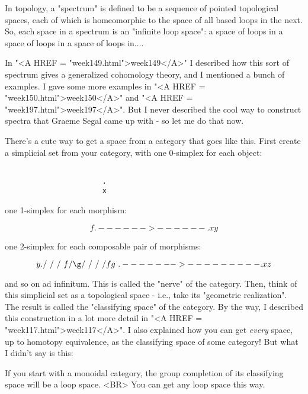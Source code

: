 In topology, a "spectrum" is defined to be a sequence of pointed
topological spaces, each of which is homeomorphic to the space of all
based loops in the next.  So, each space in a spectrum is an "infinite
loop space": a space of loops in a space of loops in a space of loops
in....

In "<A HREF = "week149.html">week149</A>" I described how this sort of spectrum gives a generalized
cohomology theory, and I mentioned a bunch of examples. I gave some
more examples in "<A HREF = "week150.html">week150</A>" and "<A HREF = "week197.html">week197</A>".  But I never described the
cool way to construct spectra that Graeme Segal came up with - so let
me do that now.

There's a cute way to get a space from a category that goes like this.
First create a simplicial set from your category, with one 0-simplex for
each object:


\begin{verbatim}

                       .
                       x
\end{verbatim}
    
one 1-simplex for each morphism:


$$

                       f
                .------>------.
                x             y
$$
    
one 2-simplex for each composable pair of morphisms:


$$

                       y
                       .
                      / \
                     /   \
                    /     \
                  f/       \g
                  /         \
                 /           \
                /             \
               /      fg       \
              .------->---------.
              x                 z

$$
    
and so on ad infinitum.  This is called the "nerve" of the category.
Then, think of this simplicial set as a topological space - i.e., take
its "geometric realization".  The result is called the "classifying
space" of the category.  By the way, I described this construction in
a lot more detail in "<A HREF = "week117.html">week117</A>".  I also explained how you can get
\emph{every} space, up to homotopy equivalence, as the classifying space of
some category!  But what I didn't say is this:

If you start with a monoidal category, the group completion of 
its classifying space will be a loop space.  <BR>
You can get any loop space this way.

